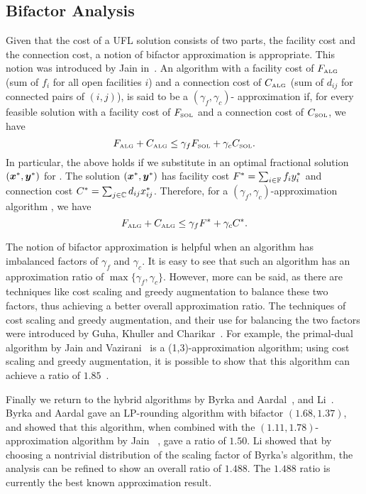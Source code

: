\documentclass[oneside,final]{ucr}
\begin{document}
\subsection{Bifactor Analysis} \label{subsec: bifactor}
Given that the cost of a UFL solution consists of two parts,
the facility cost and the connection cost, a notion of
bifactor approximation is appropriate. This notion was
introduced by Jain {\etal} in~\cite{JainMMSV03}. An
algorithm with a facility cost of $F_{\mbox{\tiny\rm ALG}}$ (sum of
$f_i$ for all open facilities $i$) and a connection cost of
$C_{\mbox{\tiny\rm ALG}}$ (sum of $d_{ij}$ for connected pairs of
$(i,j)$), is said to be a $(\gamma_f,\gamma_c)$-
approximation if, for every feasible solution {\SOL} with a
facility cost of $F_{{{\mbox{\tiny\rm SOL}}}}$ and a connection cost of
$C_{{{\mbox{\tiny\rm SOL}}}}$, we have
\begin{equation*}
  F_{\mbox{\tiny\rm ALG}} + C_{\mbox{\tiny\rm ALG}} \leq \gamma_f F_{{{\mbox{\tiny\rm SOL}}}} +
  \gamma_c C_{{{\mbox{\tiny\rm SOL}}}}.
\end{equation*}
In particular, the above holds if we substitute in an
optimal fractional solution $(\boldsymbol{x}^\ast,\boldsymbol{y}^\ast)$ for
{\SOL}. The solution $(\boldsymbol{x}^\ast,\boldsymbol{y}^\ast)$ has facility
cost $F^\ast = \sum_{i\in\mathbb{F}} f_i y_i^\ast$ and
connection cost $C^\ast = \sum_{j\in\mathbb{C}} d_{ij}
x_{ij}^\ast$. Therefore, for a
$(\gamma_f,\gamma_c)$-approximation algorithm {\ALG}, we
have
\begin{equation*}
  F_{\mbox{\tiny\rm ALG}} + C_{\mbox{\tiny\rm ALG}} \leq \gamma_f F^\ast +
  \gamma_c C^\ast.
\end{equation*}

The notion of bifactor approximation is helpful when an
algorithm has imbalanced factors of $\gamma_f$ and
$\gamma_c$. It is easy to see that such an algorithm has an
approximation ratio of $\max\{\gamma_f,
\gamma_c\}$. However, more can be said, as there are
techniques like cost scaling and greedy augmentation to
balance these two factors, thus achieving a better overall
approximation ratio. The techniques of cost scaling and
greedy augmentation, and their use for balancing the two
factors were introduced by Guha, Khuller and
Charikar~\cite{GuhaK98, CharikarG05}. For example, the
primal-dual algorithm by Jain and Vazirani~\cite{JainV03} is
a (1,3)-approximation algorithm; using cost scaling and
greedy augmentation, it is possible to show that this
algorithm can achieve a ratio of $1.85$~\cite{CharikarG05}.

Finally we return to the hybrid algorithms by Byrka and
Aardal~\cite{ByrkaA10}, and Li~\cite{Li11}. Byrka and Aardal
gave an LP-rounding algorithm with bifactor $(1.68,1.37)$,
and showed that this algorithm, when combined with the
$(1.11,1.78)$-approximation algorithm by Jain
{\etal}~\cite{JainMMSV03}, gave a ratio of $1.50$. Li showed
that by choosing a nontrivial distribution of the scaling
factor of Byrka's algorithm, the analysis can be refined to
show an overall ratio of $1.488$. The $1.488$ ratio is
currently the best known approximation result.
\end{document}
